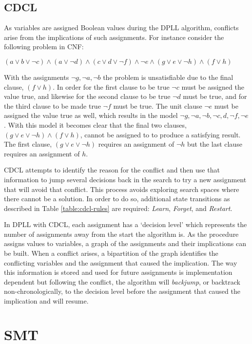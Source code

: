 \documentclass[]{final_report}
\begin{document}
\subsection{CDCL}
As variables are assigned Boolean values during the DPLL algorithm, conflicts arise from the implications of such assignments. For instance consider the following problem in CNF:

$(a \lor b \lor \lnot c) \land (a \lor \lnot d) \land (c \lor d \lor \lnot{f}) \land \lnot{e} \land (g \lor e \lor \lnot h) \land (f \lor h)$

With the assignments $\lnot{g}, \lnot{a}, \lnot{b}$ the problem is unsatisfiable due to the final clause, $(f \lor h)$. In order for the first clause to be true $\lnot c$ must be assigned the value true, and likewise for the second clause to be true $\lnot d$ must be true, and for the third clause to be made true $\lnot{f}$ must be true. The unit clause $\lnot{e}$ must be assigned the value true as well, which results in the model $\lnot{g}, \lnot{a}, \lnot{b}, \lnot{c}, d, \lnot{f}, \lnot{e}$. With this model it becomes clear that the final two clauses, $(g \lor e \lor \lnot h) \land (f \lor h)$, cannot be assigned to to produce a satisfying result. The first clause, $(g \lor e \lor \lnot h)$ requires an assignment of $\lnot{h}$ but the last clause requires an assignment of $h$.

CDCL attempts to identify the reason for the conflict and then use that information to jump several decisions back in the search to try a new assignment that will avoid that conflict. This process avoids exploring search spaces where there cannot be a solution. In order to do so, additional state transitions as described in Table \ref{table:cdcl-rules} are required: \textit{Learn}, \textit{Forget}, and \textit{Restart}.

In DPLL with CDCL, each assignment has a `decision level' which represents the number of assignments away from the start the algorithm is. As the procedure assigns values to variables, a graph of the assignments and their implications can be built. When a conflict arises, a bipartition of the graph identifies the conflicting variables and the assignment that caused the implication. The way this information is stored and used for future assignments is implementation dependent but following the conflict, the algorithm will \textit{backjump}, or backtrack non-chronologically, to the decision level before the assignment that caused the implication and will resume.

\section{SMT}
\end{document}
